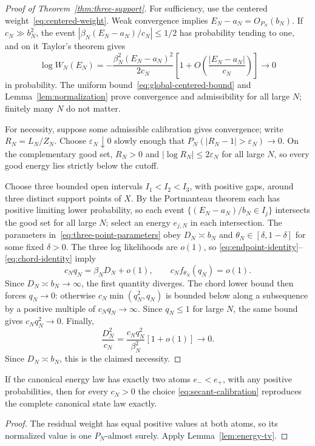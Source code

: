 \begin{proof}[Proof of Theorem~\ref{thm:three-support}]
For sufficiency, use the centered weight~\eqref{eq:centered-weight}.
Weak convergence implies $E_N-a_N=O_{P_N}(b_N)$. If $c_N\gg b_N^2$, the
event $|\beta_N(E_N-a_N)/c_N|\le1/2$ has probability tending to one,
and on it Taylor's theorem gives
\[
 \log W_N(E_N)
 =-\frac{\beta_N^2(E_N-a_N)^2}{2c_N}
 \left[1+O\!\left(\frac{|E_N-a_N|}{c_N}\right)\right]
 \longrightarrow0
\]
in probability. The uniform bound~\eqref{eq:global-centered-bound}
and Lemma~\ref{lem:normalization} prove convergence and
admissibility for all large $N$; finitely many $N$ do not matter.

For necessity, suppose some admissible calibration gives convergence;
write $R_N=L_N/Z_N$. Choose $\varepsilon_N\downarrow0$ slowly enough
that $P_N(|R_N-1|>\varepsilon_N)\to0$. On the complementary good set,
$R_N>0$ and $|\log R_N|\le2\varepsilon_N$ for all large $N$, so every
good energy lies strictly below the cutoff.

Choose three bounded open intervals $I_1<I_2<I_3$, with positive
gaps, around three distinct support points of $X$. By the Portmanteau
theorem each has positive limiting lower probability, so each event
$\{(E_N-a_N)/b_N\in I_j\}$ intersects the good set for all large $N$;
select an energy $e_{j,N}$ in each intersection. The parameters
in~\eqref{eq:three-point-parameters} obey $D_N\asymp b_N$ and
$\theta_N\in[\delta,1-\delta]$ for some fixed $\delta>0$. The three log
likelihoods are $o(1)$, so
\eqref{eq:endpoint-identity}--\eqref{eq:chord-identity} imply
\begin{equation}
 c_Nq_N=\beta_ND_N+o(1),\qquad
 c_Nf_{\theta_N}(q_N)=o(1).
 \label{eq:good-point-identities}
\end{equation}
Since $D_N\asymp b_N\to\infty$, the first quantity diverges. The chord
lower bound then forces $q_N\to0$: otherwise $c_N\min(q_N^2,q_N)$ is
bounded below along a subsequence by a positive multiple of
$c_Nq_N\to\infty$. Since $q_N\le1$ for large $N$, the same bound
gives $c_Nq_N^2\to0$. Finally,
\[
 \frac{D_N^2}{c_N}
 =\frac{c_Nq_N^2}{\beta_N^2}[1+o(1)]\longrightarrow0.
\]
Since $D_N\asymp b_N$, this is the claimed necessity.
\end{proof}

\begin{proposition}
\label{prop:two-atoms}
If the canonical energy law has exactly two atoms $e_-<e_+$, with any
positive probabilities, then for every $c_N>0$ the choice
\eqref{eq:secant-calibration} reproduces the complete canonical state
law exactly.
\end{proposition}
\begin{proof}
The residual weight has equal positive values at both atoms, so its
normalized value is one $P_N$-almost surely. Apply
Lemma~\ref{lem:energy-tv}.
\end{proof}

